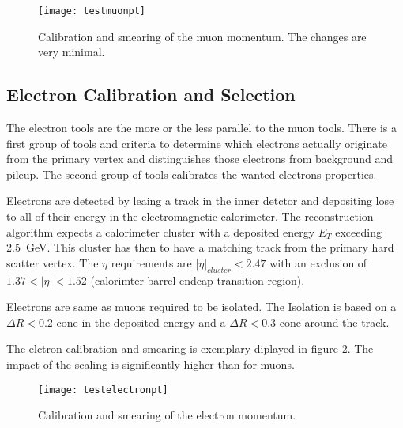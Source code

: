 \begin{figure}[h]
\centering
\texttt{[image: testmuonpt]}
\caption{Calibration and smearing of the muon momentum. The changes are very minimal.}
\label{fig:testmuonpt}
\end{figure}

\subsection{Electron Calibration and Selection}

The electron tools are the more or the less parallel to the muon tools. There is a first group of tools and criteria to determine which electrons actually originate from the primary vertex and distinguishes those electrons from background and pileup. The second group of tools calibrates the wanted electrons properties.

Electrons are detected by leaing a track in the inner detctor and depositing lose to all of their energy in the electromagnetic calorimeter. The reconstruction algorithm expects a calorimeter cluster with a deposited energy $E_T$ exceeding \SI{2.5}{\GeV}. This cluster has then to have a matching track from the primary hard scatter vertex. The $\eta$ requirements are $|\eta|_{cluster} < 2.47$ with an exclusion of $\num{1.37} < |\eta| < \num{1.52}$ (calorimter barrel-endcap transition region).

Electrons are same as muons required to be isolated. The Isolation is based on a $\Delta R < \num{0.2}$ cone in the deposited energy and a $\Delta R < \num{0.3}$ cone around the track.

The elctron calibration and smearing is exemplary diplayed in figure \ref{fig:testelectronpt}. The impact of the scaling is significantly higher than for muons.

\begin{figure}
\centering
\texttt{[image: testelectronpt]}
\caption{Calibration and smearing of the electron momentum.}
\label{fig:testelectronpt}
\end{figure}